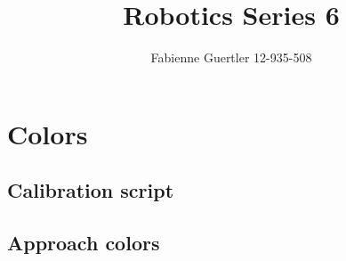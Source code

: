\documentclass[a4paper]{article}
\title{Robotics Series 6}
\author{Fabienne Guertler 12-935-508}
\begin{document}
	
	\section{Colors}
	\subsection{Calibration script}
	\subsection{Approach colors}
	
\end{document}
